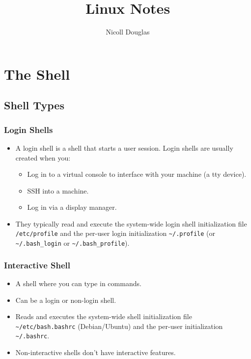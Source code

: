 \documentclass{article}
\title{Linux Notes}
\author{Nicoll Douglas}
\newcommand{\code}[1]{\texttt{#1}}
\newcommand{\home}[1]{\code{\textasciitilde #1}}
\begin{document}
\maketitle
\tableofcontents

\section{The Shell}

\subsection{Shell Types}

\subsubsection{Login Shells}

\begin{itemize}
    \item A login shell is a shell that starts a user session. Login shells are usually created when you:
    \begin{itemize}
        \item Log in to a virtual console to interface with your machine (a tty device).
        \item SSH into a machine.
        \item Log in via a display manager.
    \end{itemize}
    \item They typically read and execute the system-wide login shell initialization file \code{/etc/profile} and the per-user login initialization \home{/.profile} (or \home{/.bash\_login} or \home{/.bash\_profile}).
\end{itemize}

\subsubsection{Interactive Shell}

\begin{itemize}
    \item A shell where you can type in commands.
    \item Can be a login or non-login shell.
    \item Reads and executes the system-wide shell initialization file \\\home{/etc/bash.bashrc} (Debian/Ubuntu) and the per-user initialization \\\home{/.bashrc}.
    \item Non-interactive shells don't have interactive features.
\end{itemize}
\end{document}
